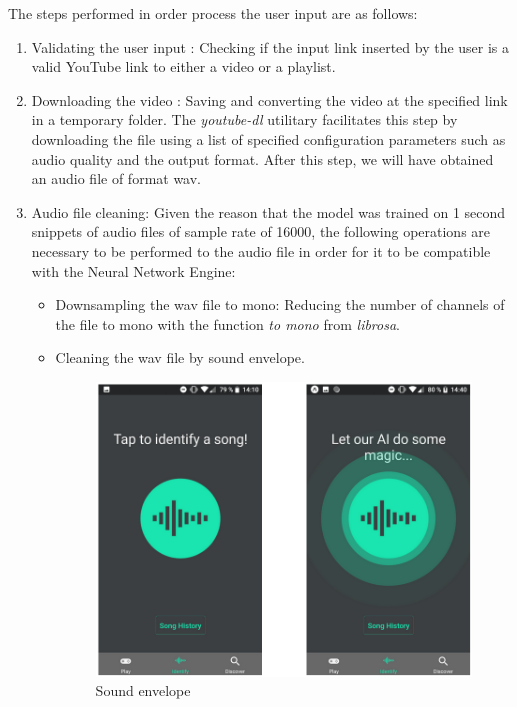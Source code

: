 The steps performed in order process the user input are as follows:
\begin{enumerate}

	\item Validating the user input : Checking if the input link inserted by the user is a valid YouTube link to
	either a video or a playlist.
	\item Downloading the video : Saving and converting the video at the specified link in a temporary folder.
		The \textit{youtube-dl} utilitary facilitates this step by downloading the file using
	a list of specified configuration parameters such as audio quality and the output format. After this step,
	we will have obtained an audio file of format wav.
	\item Audio file cleaning: Given the reason that the model was trained on 1 second snippets of audio files of sample rate of 16000,
		the following operations are necessary to be performed to the audio file in order for it to be compatible with the Neural Network Engine:
		\begin{itemize}
			\item Downsampling the wav file to mono: Reducing the number of channels of the file to
			mono with the function \textit{to mono} from \textit{librosa}.
			\item Cleaning the wav file by sound envelope.
			\begin{figure}[H]
				\centering
				\includegraphics{images/spektrum.png}
				\caption{Sound envelope}
			\label{se}
			\end{figure}


\end{itemize}
\end{enumerate}
